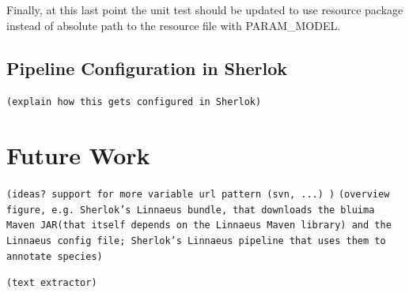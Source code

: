 \documentclass{article}
\newcommand{\ID}[1]{{\textsc{#1}}}
\newcommand{\JAR}{JAR\xspace}
\newcommand{\TODO}[1]{\texttt{\textcolor{YellowOrange}{(#1)}}} %
\begin{document}
Finally, at this last point the unit test should be updated to use resource package instead of
absolute path to the resource file with \ID{PARAM\_MODEL}.

\subsection{Pipeline Configuration in Sherlok}

\TODO{explain how this gets configured in Sherlok}


\section{Future Work}

\TODO{ideas? support for more variable url pattern (svn, ...) }
\TODO{overview figure, e.g.  Sherlok's Linnaeus bundle, that downloads the bluima Maven \JAR (that itself depends on the Linnaeus Maven library) and the Linnaeus config file; Sherlok's Linnaeus pipeline that uses them to annotate species}

\TODO{text extractor}

\end{document}
